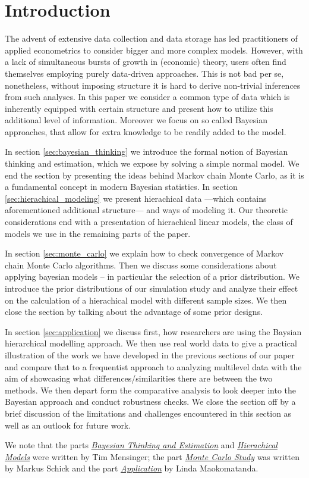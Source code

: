\section{Introduction}

The advent of extensive data collection and data storage has led practitioners of applied econometrics to consider bigger and more complex models.
However, with a lack of simultaneous bursts of growth in (economic) theory, users often find themselves employing purely data-driven approaches.
This is not bad per se, nonetheless, without imposing structure it is hard to derive non-trivial inferences from such analyses.
In this paper we consider a common type of data which is inherently equipped with certain structure and present how to utilize this additional level of information.
Moreover we focus on so called Bayesian approaches, that allow for extra knowledge to be readily added to the model.

In section \ref{sec:bayesian_thinking} we introduce the formal notion of Bayesian thinking and estimation, which we expose by solving a simple normal model.
We end the section by presenting the ideas behind Markov chain Monte Carlo, as it is a fundamental concept in modern Bayesian statistics.
In section \ref{sec:hierachical_modeling} we present hierachical data ---which contains aforementioned additional structure--- and ways of modeling it.
Our theoretic considerations end with a presentation of hierachical linear models, the class of models we use in the remaining parts of the paper.

In section \ref{sec:monte_carlo} we explain how to check convergence of Markov chain Monte Carlo algorithms. 
Then we discuss some considerations about applying bayesian models -- in particular the selection of a prior distribution. 
We introduce the prior distributions of our simulation study and analyze their effect on the calculation of a hierachical model with different sample sizes. 
We then close the section by talking about the advantage of some prior designs. 


In section \ref{sec:application} we discuss first, how researchers are using the Baysian hierarchical modelling approach. We then use real world data to give a practical illustration of the work we have developed in the previous sections of our paper and compare that to a frequentist approach to analyzing multilevel data with the aim of showcasing what differences/similarities there are between the two methods. We then depart form the comparative analysis to look deeper into the Bayesian approach and conduct robustness checks. We close the section off by a brief discussion of the limitations and challenges encountered in this section as well as an outlook for future work.

We note that the parts \hyperref[sec:bayesian_thinking]{\emph{Bayesian Thinking and Estimation}} and \hyperref[sec:hierachical_modeling]{\emph{Hierachical Models}} were written by Tim Mensinger; the part \hyperref[sec:monte_carlo]{\emph{Monte Carlo Study}} was written by Markus Schick and the part \hyperref[sec:application]{\emph{Application}} by Linda Maokomatanda.
